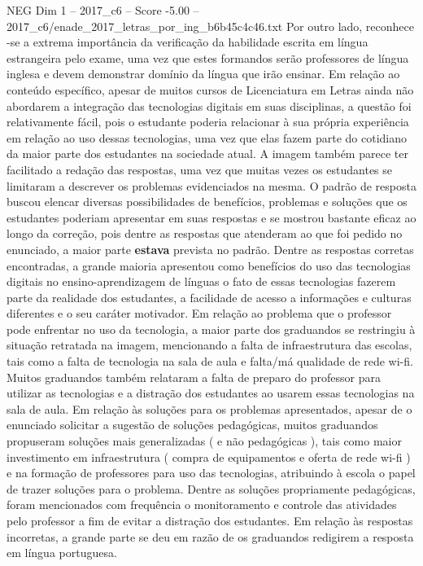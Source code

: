 \begin{textsample}{NEG Dim 1 – 2017\_c6 – Score -5.00 – 2017\_c6/enade\_2017\_letras\_por\_ing\_b6b45c4c46.txt}
Por outro lado, reconhece -se a extrema importância da verificação da habilidade escrita em língua estrangeira pelo exame, uma vez que estes formandos serão professores de língua inglesa e devem demonstrar domínio da língua que irão ensinar.
Em relação ao conteúdo específico, apesar de muitos cursos de Licenciatura em Letras ainda não abordarem a integração das tecnologias digitais em suas disciplinas, a questão foi relativamente fácil, pois o estudante poderia relacionar à sua própria experiência em relação ao uso dessas tecnologias, uma vez que elas fazem parte do cotidiano da maior parte dos estudantes na sociedade atual.
A imagem também parece ter facilitado a redação das respostas, uma vez que muitas vezes os estudantes se limitaram a descrever os problemas evidenciados na mesma.
O padrão de resposta buscou elencar diversas possibilidades de benefícios, problemas e soluções que os estudantes poderiam apresentar em suas respostas e se mostrou bastante eficaz ao longo da correção, pois dentre as respostas que atenderam ao que foi pedido no enunciado, a maior parte \textbf{estava} prevista no padrão.
Dentre as respostas corretas encontradas, a grande maioria apresentou como benefícios do uso das tecnologias digitais no ensino-aprendizagem de línguas o fato de essas tecnologias fazerem parte da realidade dos estudantes, a facilidade de acesso a informações e culturas diferentes e o seu caráter motivador.
Em relação ao problema que o professor pode enfrentar no uso da tecnologia, a maior parte dos graduandos se restringiu à situação retratada na imagem, mencionando a falta de infraestrutura das escolas, tais como a falta de tecnologia na sala de aula e falta/má qualidade de rede wi-fi.
Muitos graduandos também relataram a falta de preparo do professor para utilizar as tecnologias e a distração dos estudantes ao usarem essas tecnologias na sala de aula.
Em relação às soluções para os problemas apresentados, apesar de o enunciado solicitar a sugestão de soluções pedagógicas, muitos graduandos propuseram soluções mais generalizadas ( e não pedagógicas ), tais como maior investimento em infraestrutura ( compra de equipamentos e oferta de rede wi-fi ) e na formação de professores para uso das tecnologias, atribuindo à escola o papel de trazer soluções para o problema.
Dentre as soluções propriamente pedagógicas, foram mencionados com frequência o monitoramento e controle das atividades pelo professor a fim de evitar a distração dos estudantes.
Em relação às respostas incorretas, a grande parte se deu em razão de os graduandos redigirem a resposta em língua portuguesa.

\end{textsample}
